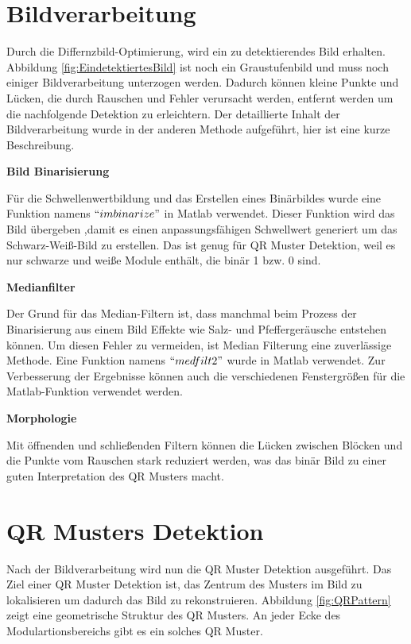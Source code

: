 \section{Bildverarbeitung} 
Durch die Differnzbild-Optimierung, wird ein zu detektierendes Bild erhalten. Abbildung \ref{fig:EindetektiertesBild} ist noch ein Graustufenbild und muss noch einiger Bildverarbeitung unterzogen werden. Dadurch können kleine Punkte und Lücken, die durch Rauschen und Fehler verursacht werden, entfernt werden um die nachfolgende Detektion zu erleichtern. Der detaillierte Inhalt der Bildverarbeitung wurde in der anderen Methode aufgeführt, hier ist eine kurze Beschreibung. 

\textbf{Bild Binarisierung}

Für die Schwellenwertbildung und das Erstellen eines Binärbildes wurde eine Funktion namens $ ``imbinarize" $ in Matlab verwendet. Dieser Funktion wird das Bild übergeben ,damit es einen anpassungsfähigen Schwellwert generiert um das Schwarz-Weiß-Bild zu erstellen. Das ist genug für QR Muster Detektion, weil es nur schwarze und weiße Module enthält, die binär 1 bzw. 0 sind. 

\textbf{Medianfilter}

Der Grund für das Median-Filtern ist, dass manchmal beim Prozess der Binarisierung aus einem Bild Effekte wie Salz- und Pfeffergeräusche entstehen können. Um diesen Fehler zu vermeiden, ist Median Filterung eine zuverlässige Methode. Eine Funktion namens $ ``medfilt2" $ wurde in Matlab verwendet. Zur Verbesserung der Ergebnisse können auch die verschiedenen Fenstergrößen für die Matlab-Funktion verwendet werden.

\textbf{Morphologie}

Mit öffnenden und schließenden Filtern können die Lücken zwischen Blöcken und die Punkte vom Rauschen stark reduziert werden, was das binär Bild zu einer guten Interpretation des QR Musters macht. 

\section{QR Musters Detektion} 

Nach der Bildverarbeitung wird nun die QR Muster Detektion ausgeführt. Das Ziel einer QR Muster Detektion ist, das Zentrum des Musters im Bild zu lokalisieren um dadurch das Bild zu rekonstruieren. Abbildung \ref{fig:QRPattern} zeigt eine geometrische Struktur des QR Musters. An jeder Ecke des Modulartionsbereichs gibt es ein solches QR Muster.

